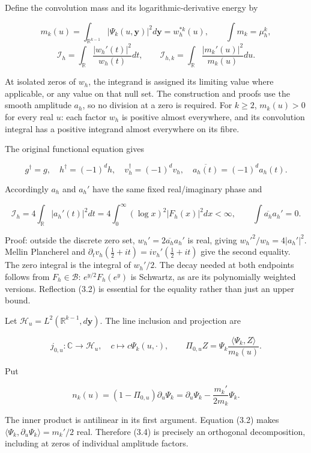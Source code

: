 \documentclass[
]{article}
\begin{document}
Define the convolution mass and its logarithmic-derivative energy by

\[m_k(u)=\int_{\mathbb R^{k-1}}|\Psi_k(u,\mathbf y)|^2d\mathbf y=w_h^{*k}(u),\qquad \int m_k=\mu_h^k,\]
\[\mathcal I_h=\int_{\mathbb R}\frac{|w_h'(t)|^2}{w_h(t)}dt,\qquad \mathcal I_{h,k}=\int_{\mathbb R}\frac{|m_k'(u)|^2}{m_k(u)}du.\tag{3.1}\]

At isolated zeros of \(w_h\), the integrand is assigned its limiting
value where applicable, or any value on that null set. The construction
and proofs use the smooth amplitude \(a_h\), so no division at a zero is
required. For \(k\ge2\), \(m_k(u)>0\) for every real \(u\): each factor
\(w_h\) is positive almost everywhere, and its convolution integral has
a positive integrand almost everywhere on its fibre.

The original functional equation gives

\[g^\dagger=g,\quad h^\dagger=(-1)^dh,\quad v_h^\dagger=(-1)^dv_h,\quad
\overline{a_h(t)}=(-1)^da_h(t).\tag{3.2}\]

Accordingly \(a_h\) and \(a_h'\) have the same fixed real/imaginary
phase and

\[\boxed{\mathcal I_h=4\int_{\mathbb R}|a_h'(t)|^2dt=4\int_0^\infty(\log x)^2|F_h(x)|^2dx<\infty,\qquad \int\overline{a_h}a_h'=0.}\tag{3.3}\]

Proof: outside the discrete zero set, \(w_h'=2\overline{a_h}a_h'\) is
real, giving \(w_h'^2/w_h=4|a_h'|^2\). Mellin Plancherel and
\(\partial_tv_h(\tfrac12+it)=iv_h'(\tfrac12+it)\) give the second
equality. The zero integral is the integral of \(w_h'/2\). The decay
needed at both endpoints follows from \(F_h\in\mathscr B\):
\(e^{y/2}F_h(e^y)\) is Schwartz, as are its polynomially weighted
versions. Reflection (3.2) is essential for the equality rather than
just an upper bound.

Let \(\mathscr H_u=L^2(\mathbb R^{k-1},d\mathbf y)\). The line inclusion
and projection are

\[j_{0,u}:\mathbb C\to\mathscr H_u,\quad c\mapsto c\Psi_k(u,\cdot),\qquad
\Pi_{0,u}Z=\Psi_k\frac{\langle\Psi_k,Z\rangle}{m_k(u)}.\]

Put

\[n_k(u)=(1-\Pi_{0,u})\partial_u\Psi_k=\partial_u\Psi_k-\frac{m_k'}{2m_k}\Psi_k.\tag{3.4}\]

The inner product is antilinear in its first argument. Equation (3.2)
makes \(\langle\Psi_k,\partial_u\Psi_k\rangle=m_k'/2\) real. Therefore
(3.4) is precisely an orthogonal decomposition, including at zeros of
individual amplitude factors.
\end{document}

